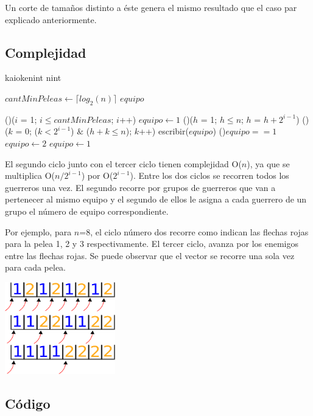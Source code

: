         Un corte de tamaños distinto a éste genera el mismo resultado que el caso par explicado anteriormente. \;






    \subsection{Complejidad}

    \begin{algoritmo}{kaioken}{int n}{int}

   $cantMinPeleas \gets \lceil log_{2}(n) \rceil$ 
   $equipo$ 

  \For(){($i$ = 1; $i \leq cantMinPeleas$; $i$++)}{
    $equipo \gets 1$ 
    \For(){($h$ = 1; $h \leq n$; $h$ = $h + 2^{i-1}$)}{
      \For(){($k$ = 0; ($k < 2^{i-1}$) $\&$ ($h+k \leq n$); $k$++)}{
        escribir($equipo$) 
      }
        \eIf(){$equipo == 1$}{
          $equipo \gets 2$ \;
        }{
          $equipo \gets 1$ \;
        }
    }
  }


\end{algoritmo}

El segundo ciclo junto con el tercer ciclo tienen complejidad O($n$), ya que se multiplica O($n/2^{i-1}$) por O($2^{i-1}$). Entre los dos ciclos se recorren todos los guerreros una vez. El segundo recorre por grupos de guerreros que van a pertenecer al mismo equipo y el segundo de ellos le asigna a cada guerrero de un grupo el número de equipo correspondiente. 

Por ejemplo, para $n$=8, el ciclo número dos recorre como indican las flechas rojas para la pelea 1, 2 y 3 respectivamente. El tercer ciclo, avanza por los enemigos entre las flechas rojas. Se puede observar que el vector se recorre una sola vez para cada pelea. 


\includegraphics[height=4cm]{graficos/ciclo.png}


    \subsection{Código}


